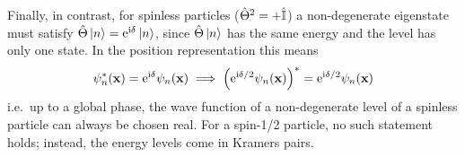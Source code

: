 Finally, in contrast, for spinless particles ($\hat{\Theta}^2 = +\hat{\mathbb{I}}$) a non-degenerate eigenstate must satisfy $\hat{\Theta} \ket{n} = \mathrm{e}^{\mathrm{i} \delta} \ket{n}$, since $\hat{\Theta}\ket{n}$ has the same energy and the level has only one state. In the position representation this means
\begin{align*}
    \psi_n^*(\mathbf{x}) = \mathrm{e}^{\mathrm{i} \delta} \psi_n(\mathbf{x}) \implies \left( \mathrm{e}^{\mathrm{i} \delta / 2} \psi_n(\mathbf{x}) \right)^* = \mathrm{e}^{\mathrm{i} \delta/2} \psi_n(\mathbf{x})
\end{align*}
i.e.\ up to a global phase, the wave function of a non-degenerate level of a spinless particle can always be chosen real. For a spin-1/2 particle, no such statement holds; instead, the energy levels come in Kramers pairs.











